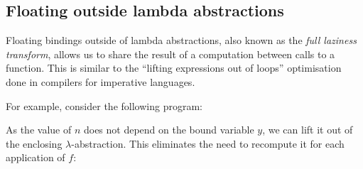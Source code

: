 

\subsection{Floating outside lambda abstractions}
\label{Core:Optimisation:floating-out}

Floating bindings outside of lambda abstractions, also known as the \emph{full laziness transform}, allows us to share the result of a computation between calls to a function. This is similar to the ``lifting expressions out of loops'' optimisation done in compilers for imperative languages.

For example, consider the following program:


As the value of $n$ does not depend on the bound variable $y$, we can lift it out of the enclosing $\lambda$-abstraction. This eliminates the need to recompute it for each application of $f$:


